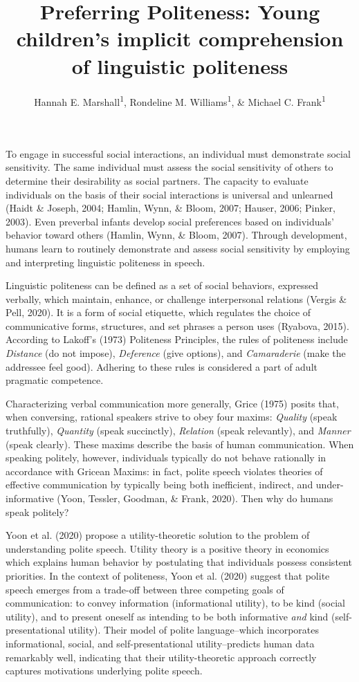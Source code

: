 \documentclass[
  english,
  man,floatsintext]{apa6}
\title{Preferring Politeness: Young children's implicit comprehension of linguistic politeness}
\author{Hannah E. Marshall\textsuperscript{1}, Rondeline M. Williams\textsuperscript{1}, \& Michael C. Frank\textsuperscript{1}}
\date{}
\affiliation{\vspace{0.5cm}\textsuperscript{1} Stanford University}
\begin{document}
\maketitle

To engage in successful social interactions, an individual must demonstrate social sensitivity. The same individual must assess the social sensitivity of others to determine their desirability as social partners. The capacity to evaluate individuals on the basis of their social interactions is universal and unlearned (Haidt \& Joseph, 2004; Hamlin, Wynn, \& Bloom, 2007; Hauser, 2006; Pinker, 2003). Even preverbal infants develop social preferences based on individuals' behavior toward others (Hamlin, Wynn, \& Bloom, 2007). Through development, humans learn to routinely demonstrate and assess social sensitivity by employing and interpreting linguistic politeness in speech.

Linguistic politeness can be defined as a set of social behaviors, expressed verbally, which maintain, enhance, or challenge interpersonal relations (Vergis \& Pell, 2020). It is a form of social etiquette, which regulates the choice of communicative forms, structures, and set phrases a person uses (Ryabova, 2015). According to Lakoff's (1973) Politeness Principles, the rules of politeness include \emph{Distance} (do not impose), \emph{Deference} (give options), and \emph{Camaraderie} (make the addressee feel good). Adhering to these rules is considered a part of adult pragmatic competence.

Characterizing verbal communication more generally, Grice (1975) posits that, when conversing, rational speakers strive to obey four maxims: \emph{Quality} (speak truthfully), \emph{Quantity} (speak succinctly), \emph{Relation} (speak relevantly), and \emph{Manner} (speak clearly). These maxims describe the basis of human communication. When speaking politely, however, individuals typically do not behave rationally in accordance with Gricean Maxims: in fact, polite speech violates theories of effective communication by typically being both inefficient, indirect, and under-informative (Yoon, Tessler, Goodman, \& Frank, 2020). Then why do humans speak politely?

Yoon et al. (2020) propose a utility-theoretic solution to the problem of understanding polite speech. Utility theory is a positive theory in economics which explains human behavior by postulating that individuals possess consistent priorities. In the context of politeness, Yoon et al. (2020) suggest that polite speech emerges from a trade-off between three competing goals of communication: to convey information (informational utility), to be kind (social utility), and to present oneself as intending to be both informative \emph{and} kind (self-presentational utility). Their model of polite language--which incorporates informational, social, and self-presentational utility--predicts human data remarkably well, indicating that their utility-theoretic approach correctly captures motivations underlying polite speech.
\end{document}
